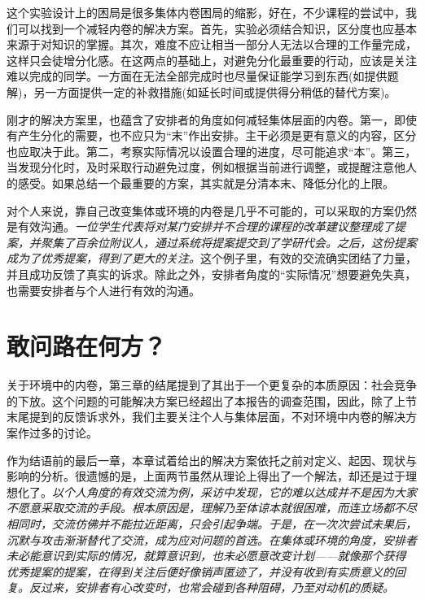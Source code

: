 \documentclass[UTF8,a4paper,fontset=windows,11pt,openany]{ctexbook}
\begin{document}
这个实验设计上的困局是很多集体内卷困局的缩影，好在，不少课程的尝试中，我们可以找到一个减轻内卷的解决方案。首先，实验必须结合知识，区分度也应基本来源于对知识的掌握。其次，难度不应让相当一部分人无法以合理的工作量完成，这样只会徒增分化感。在这两点的基础上，对避免分化最重要的行动，应该是关注难以完成的同学。一方面在无法全部完成时也尽量保证能学习到东西(如提供题解)，另一方面提供一定的补救措施(如延长时间或提供得分稍低的替代方案)。

刚才的解决方案里，也蕴含了安排者的角度如何减轻集体层面的内卷。第一，即使有产生分化的需要，也不应只为“末”作出安排。主干必须是更有意义的内容，区分也应取决于此。第二，考察实际情况以设置合理的进度，尽可能追求“本”。第三，当发现分化时，及时采取行动避免过度，例如根据当前进行调整，或提醒注意他人的感受。如果总结一个最重要的方案，其实就是分清本末、降低分化的上限。

对个人来说，靠自己改变集体或环境的内卷是几乎不可能的，可以采取的方案仍然是有效沟通。\emph{一位学生代表将对某门安排并不合理的课程的改革建议整理成了提案，并聚集了百余位附议人，通过系统将提案提交到了学研代会。之后，这份提案成为了优秀提案，得到了更大的关注。}这个例子里，有效的交流确实团结了力量，并且成功反馈了真实的诉求。除此之外，安排者角度的“实际情况”想要避免失真，也需要安排者与个人进行有效的沟通。

\section{敢问路在何方？}

关于环境中的内卷，第三章的结尾提到了其出于一个更复杂的本质原因：社会竞争的下放。这个问题的可能解决方案已经超出了本报告的调查范围，因此，除了上节末尾提到的反馈诉求外，我们主要关注个人与集体层面，不对环境中内卷的解决方案作过多的讨论。

作为结语前的最后一章，本章试着给出的解决方案依托之前对定义、起因、现状与影响的分析。很遗憾的是，上面两节虽然从理论上得出了一个解法，却还是过于理想化了。\emph{以个人角度的有效交流为例，采访中发现，它的难以达成并不是因为大家不愿意采取交流的手段。根本原因是，理解乃至体谅本就很困难，而连立场都不尽相同时，交流仿佛并不能拉近距离，只会引起争端。于是，在一次次尝试未果后，沉默与攻击渐渐替代了交流，成为应对问题的首选。在集体或环境的角度，安排者未必能意识到实际的情况，就算意识到，也未必愿意改变计划——就像那个获得优秀提案的提案，在得到关注后便好像销声匿迹了，并没有收到有实质意义的回复。反过来，安排者有心改变时，也常会碰到各种阻碍，乃至对动机的质疑。}
\end{document}
